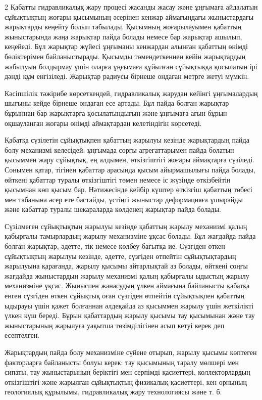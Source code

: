 \begin{multicols}{2}
Қабатты гидравликалық жару процесі жасанды жасау және ұңғымаға айдалатын
сұйықтықтың жоғары қысымының әсерінен кенжар аймағындағы жыныстардағы
жарықтарды кеңейту болып табылады. Қысымның жоғарылауымен қабаттың
жыныстарында жаңа жарықтар пайда болады немесе бар жарықтар ашылып,
кеңейеді. Бұл жарықтар жүйесі ұңғыманы кенжардан алынған қабаттың өнімді
бөліктерімен байланыстырады. Қысымды төмендеткеннен кейін жарықтардың
жабылуын болдырмау үшін оларға ұңғымаға құйылған сұйықтыққа қосылатын
ірі дәнді құм енгізіледі. Жарықтар радиусы бірнеше ондаған метрге жетуі
мүмкін.

Кәсіпшілік тәжірибе көрсеткендей, гидравликалық жарудан кейінгі
ұңғымалардың шығыны кейде бірнеше ондаған есе артады. Бұл пайда болған
жарықтар бұрыннан бар жарықтарға қосылатындығын және ұңғымаға ағын бұрын
оқшауланған жоғары өнімді аймақтардан келетіндігін көрсетеді.

Қабатқа сүзілетін сұйықтықпен қабаттың жарылуы кезінде жарықтардың пайда
болу механизмі келесідей: ұңғымада сорғы агрегаттарымен пайда болатын
қысыммен жару сұйықтық, ең алдымен, өткізгіштігі жоғары аймақтарға
сүзіледі. Сонымен қатар, тігінен қабаттар арасында қысым айырмашылығы
пайда болады, өйткені қабаттар туралы өткізгіштігі төмен немесе іс
жүзінде өткізбейтін қысымнан көп қысым бар. Нәтижесінде кейбір күштер
өткізгіш қабаттың төбесі мен табанына әсер ете бастайды, үстіңгі
жыныстар деформацияға ұшырайды және қабаттар туралы шекараларда көлденең
жарықтар пайда болады.

Сүзілмеген сұйықтықтың жарылуы кезінде қабаттың жарылу механизмі қалың
қабырғалы тамырлардың жарылу механизміне ұқсас болады. Бұл жағдайда
пайда болған жарықтар, әдетте, тік немесе көлбеу бағытқа ие. Сүзгіден
өткен сұйықтықтың жарылуы кезінде, әдетте, сүзгіден өтпейтін
сұйықтықтардың жарылуына қарағанда, жарылу қысымы айтарлықтай аз болады,
өйткені соңғы жағдайда жыныстардың жарылу механизмі қалың қабырғалы
ыдыстың жарылу механизміне ұқсас. Жыныспен жанасудың үлкен аймағына
байланысты қабатқа енген сүзгіден өткен сұйықтық оған сүзгіден өтпейтін
сұйықтықпен қабаттың ыдырауы үшін қажет болғаннан әлдеқайда аз қысыммен
жарылу үшін жеткілікті үлкен күш береді. Бұрын қабаттардың жарылу қысымы
тау қысымынан және тау жыныстарының жарылуға уақытша төзімділігінен асып
кетуі керек деп есептелген.

Жарықтардың пайда болу механизміне сүйене отырып, жарылу қысымы көптеген
факторларға байланысты болуы керек: тау қысымының таралу мөлшері мен
сипаты, тау жыныстарының беріктігі мен серпімді қасиеттері,
коллекторлардың өткізгіштігі және жарылған сұйықтықтың физикалық
қасиеттері, кен орнының геологиялық құрылымы, гидравликалық жару
технологиясы және т. б.


\end{multicols}
